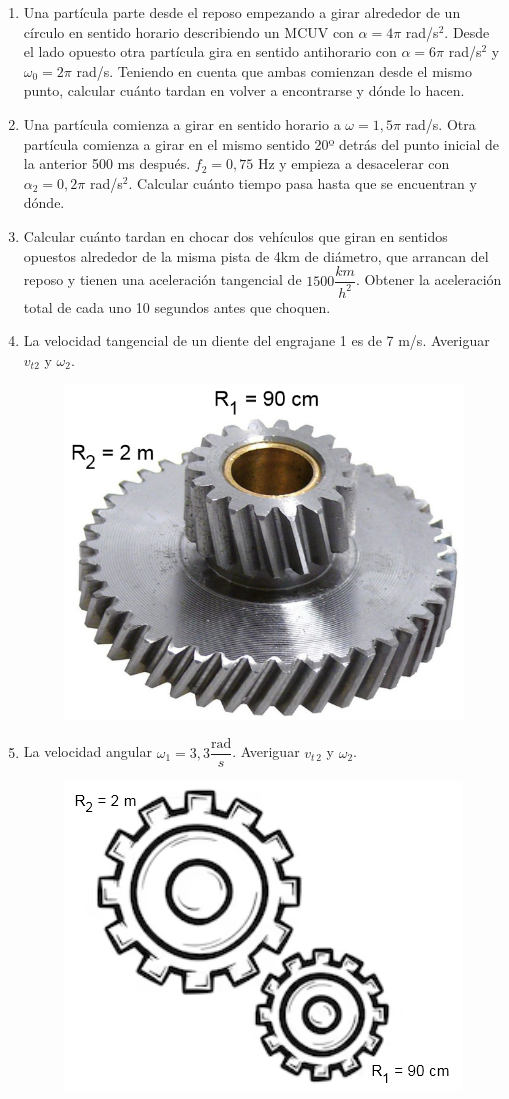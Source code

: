 \begin{enumerate}[label=\arabic*)]
\item Una partícula parte desde el reposo empezando a girar alrededor de un círculo en sentido horario describiendo un MCUV con $\alpha = 4\pi$ rad/s$^2$. Desde el lado opuesto otra partícula gira en sentido antihorario con $\alpha = 6\pi$ rad/s$^2$ y $\omega_0=2\pi$ rad/s. Teniendo en cuenta que ambas comienzan desde el mismo punto, calcular cuánto tardan en volver a encontrarse y dónde lo hacen.

\item Una partícula comienza a girar en sentido horario a $\omega=1,5\pi$ rad/s. Otra partícula comienza a girar en el mismo sentido 20º detrás del punto inicial de la anterior 500 ms después. $f_2 = 0,75$ Hz y empieza a desacelerar con $\alpha_2 = 0,2\pi$ rad/s$^2$. Calcular cuánto tiempo pasa hasta que se encuentran y dónde.

\item Calcular cuánto tardan en chocar dos vehículos que giran en sentidos opuestos alrededor de la misma pista de 4km de diámetro, que arrancan del reposo y tienen una aceleración tangencial de $1500 \dfrac{km}{h^2}$. Obtener la aceleración total de cada uno 10 segundos antes que choquen.

\newpage
\item La velocidad tangencial de un diente del engrajane 1 es de 7 m/s. Averiguar $v_{t2}$ y $\omega_2$.
\begin{figure}[H]
    \centering
    \includegraphics[width=0.3\linewidth]{images/engranaje_1.png}
\end{figure}

\item La velocidad angular $\omega_1 = 3,3\dfrac{\text{rad}}{s}$. Averiguar $v_{t\,2}$ y $\omega_2$.

\begin{figure}[H]
    \centering
    \includegraphics[width=0.4\linewidth]{images/engranaje_2.png}
\end{figure}    
\end{enumerate}

